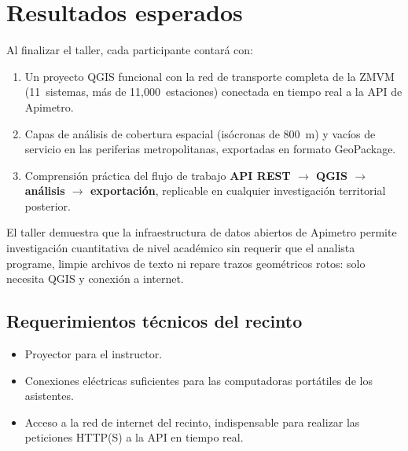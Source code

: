 
\section{Resultados esperados}

Al finalizar el taller, cada participante contará con:

\begin{enumerate}[nosep, leftmargin=1.5em]
  \item Un proyecto QGIS funcional con la red de transporte completa de la ZMVM
    (11~sistemas, más de 11,000~estaciones) conectada en tiempo real a la API de
    Apimetro.
  \item Capas de análisis de cobertura espacial (isócronas de 800~m) y vacíos
    de servicio en las periferias metropolitanas, exportadas en formato
    GeoPackage.
  \item Comprensión práctica del flujo de trabajo
    \textbf{API REST $\to$ QGIS $\to$ análisis $\to$ exportación}, replicable
    en cualquier investigación territorial posterior.
\end{enumerate}

El taller demuestra que la infraestructura de datos abiertos de Apimetro permite
investigación cuantitativa de nivel académico sin requerir que el analista
programe, limpie archivos de texto ni repare trazos geométricos rotos: solo
necesita QGIS y conexión a internet.

\subsection{Requerimientos técnicos del recinto}

\begin{itemize}[nosep, leftmargin=1.5em]
  \item Proyector para el instructor.
  \item Conexiones eléctricas suficientes para las computadoras portátiles de los
    asistentes.
  \item Acceso a la red de internet del recinto, indispensable para realizar las
    peticiones HTTP(S) a la API en tiempo real.
\end{itemize}
